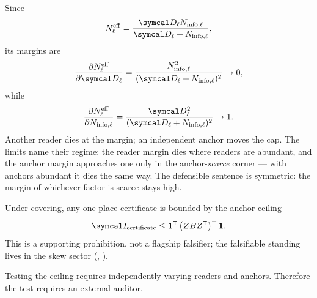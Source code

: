 \documentclass[../main]{subfiles}
\begin{document}
\begin{proposition}
  Since
  \begin{equation}
    \effectivereads[\ell]
    =\frac{\cleanreads[\ell]\infopool[\ell]}
      {\cleanreads[\ell]+\infopool[\ell]},
    \label{eq:recov:effharm}
  \end{equation}
  its margins are
  \begin{equation}
    \frac{\partial\effectivereads[\ell]}{\partial\cleanreads[\ell]}
    =\frac{\infopool[\ell]^2}{(\cleanreads[\ell]+\infopool[\ell])^2}
    \to0,
    \label{eq:recov:margclean}
  \end{equation}
  while
  \begin{equation}
    \frac{\partial\effectivereads[\ell]}{\partial\infopool[\ell]}
    =\frac{\cleanreads[\ell]^2}{(\cleanreads[\ell]+\infopool[\ell])^2}
    \to1.
    \label{eq:recov:marginfo}
  \end{equation}
  Another reader dies at the margin; an independent anchor moves the cap. The limits
  name their regime: the reader margin dies where readers are abundant, and the anchor
  margin approaches one only in the anchor-\emph{scarce} corner --- with anchors
  abundant it dies the same way. The defensible sentence is symmetric: the margin of
  whichever factor is scarce stays high.
\end{proposition}

\begin{proposition}
  Under covering, any one-place certificate is bounded by the anchor ceiling
  \begin{equation}
    \precision\sb{\mathrm{certificate}}
    \le
    \mathbf 1\transpose
    \pinv{\frameloading\anchorprior\frameloading\transpose}\mathbf 1.
    \label{eq:recov:certceil}
  \end{equation}
  This is a supporting prohibition, not a flagship falsifier; the falsifiable standing
  lives in the skew sector (, ).
\end{proposition}

\begin{remark}
  Testing the ceiling requires independently varying readers and anchors. Therefore the test
  requires an external auditor.
\end{remark}
\end{document}
